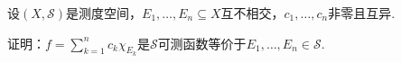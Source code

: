 \newpage

\begin{comment}
    \begin{problem}[12]\label{2.B.12}
        令\(B(a,\delta)=(a-\delta, a+\delta)\).设函数\(f: \mathbb{R} \to \mathbb{R}\).对于正整数\(k \in \mathbb{N}\)，令
        \begin{align*}
            G_k=\{a: \exists \delta>0, \forall a_1,a_2 \in B(a,\delta), \abs*{f(a_1)-f(a_2)}<1/k\}
        \end{align*}
        a.证明\(G_k\)是开集. \quad b.证明函数所有连续点的集合为\(\bigcap_{k=1}^\infty G_k\).
    \end{problem}

    \begin{proof}[证明a]
        设\(a_0 \in G_k\)，则\(\exists \delta_0>0, \forall a_1, a_2 \in B(a_0,\delta_0), \abs*{f(a_1)-f(a_2)}<1/k\).
        
        设\(a \in B(a_0,\delta_0)\).令\(\delta=\delta_0-\abs*{a_0-a}>0\)，那么\(B(a,\delta) \subseteq B(a_0,\delta_0)\).

        于是\(\forall a_1, a_2 \in B(a,\delta), \abs*{f(a_1)-f(a_2)}<1/k\)，故\(a \in G_k\)，因而\(B(a_0,\delta_0) \subseteq G_k\).
    \end{proof}

    \begin{proof}[证明b]
        若\(x \in \bigcap_{k=1}^\infty G_k\)，下证\(f\)在\(x\)处连续.\(\forall \varepsilon>0, \exists k \in \mathbb{N}, 1/k<\varepsilon, \exists \delta>0,\)
        \begin{align*}
            \sup \{\abs*{f(x)-f(a)}: a \in B(x,\delta)\} 
            \leq \sup \{\abs*{f(a_1)-f(a_2)}: a_1, a_2 \in B(x,\delta)\}<1/k<\varepsilon
        \end{align*}
        若\(f\)在\(x\)处连续，则\(\forall \varepsilon>0, \exists \delta>0, \forall a \in B(x,\delta), \abs*{f(x)-f(a)}<\varepsilon/2\).

        那么\(\forall a_1, a_2 \in B(x,\delta), \abs*{f(a_1)-f(a_2)} \leq \abs*{f(x)-f(a_1)}+\abs*{f(x)-f(a_2)}<\varepsilon/2+\varepsilon/2=\varepsilon\).

        因此\(\forall \varepsilon>0, \exists k \in \mathbb{N}, 1/k<\varepsilon, x \in \bigcap_{k=1}^\infty G_k\).
    \end{proof}
\end{comment}

\begin{problem}[13]\label{2.B.13}
    设\((X, \mathcal{S})\)是测度空间，\(E_1, \dots, E_n \subseteq X\)互不相交，\(c_1, \dots, c_n\)非零且互异.

    证明：\(f=\sum_{k=1}^n c_k \chi_{E_k}\)是\(\mathcal{S}\)可测函数等价于\(E_1, \dots, E_n \in \mathcal{S}\).
\end{problem}

